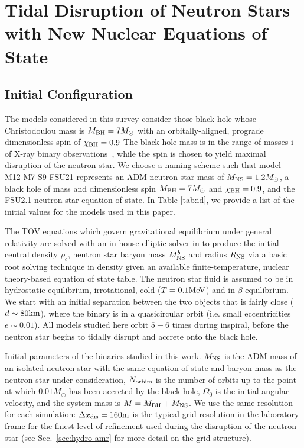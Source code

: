 \chapter{Tidal Disruption of Neutron Stars with New Nuclear Equations of State}
\label{chap:chapter-5}

\section{Initial Configuration}
\label{sec:initial-config}

The models considered in this survey consider those black hole whose Christodoulou mass is $M_{\rm BH} = 7 M_\odot$ with an orbitally-aligned, prograde dimensionless spin of $\chi_{\rm BH} = 0.9$  The black hole mass is in the range of masses i of X-ray binary observations~\cite{Ozel:2010,Kreidberg:2012}, while the spin is chosen to yield maximal disruption of the neutron star.  We choose a naming scheme such that model M12-M7-S9-FSU21 represents an ADM neutron star mass of $M_{\rm NS} = 1.2 M_\odot$, a black hole of mass and dimensionless spin $M_{\rm BH} = 7 M_\odot$ and $\chi_{\rm BH} = 0.9$, and the FSU2.1 neutron star equation of state.  In Table \ref{tab:id}, we provide a list of the initial values for the models used in this paper.

The TOV equations which govern gravitational equilibrium under general relativity are solved with an in-house elliptic solver in \SpEC to produce the initial central density $\rho_c$, neutron star baryon mass $M^b_{\rm NS}$ and radius $R_{\rm NS}$ via a basic root solving technique in density given an available finite-temperature, nuclear theory-based equation of state table.  
The neutron star fluid is assumed to be in hydrostatic equilibrium, irrotational, cold ($T = 0.1 {\rm MeV}$) and in $\beta$-equilibrium.
We start with an initial separation between the two objects that is fairly close ($d \sim 80 {\rm km}$), where the binary is in a quasicircular orbit
(i.e. small eccentricities $e \sim 0.01$).
All models studied here orbit $5 - 6$ times during inspiral, before the neutron star begins to tidally disrupt and accrete onto the black hole.

\begin{table}
	\begin{center}
	\caption[Initial parameters of binaries used in this survey]{
		Initial parameters of the binaries studied in this work. 
		$M_{\rm NS}$ is the ADM mass of an isolated neutron star with the same equation of state and baryon mass as the neutron star under
		consideration, $N_{\rm orbits}$ is the number of orbits up to the point at which $0.01M_\odot$ has been accreted by the black hole,
		$\Omega_0$ is the initial angular velocity, and the system mass is $M=M_{\rm BH}+M_{\rm NS}$. We use the same resolution for each simulation: $\Delta x_{\rm dis} = 160{\rm m}$ is the typical grid resolution in the laboratory frame
		for the finest level of refinement used during the disruption of the neutron star (see Sec.~\ref{sec:hydro-amr} for more detail on the grid structure).}
	\label{tab:id}
	{
		
	}
	\end{center}
\end{table}


